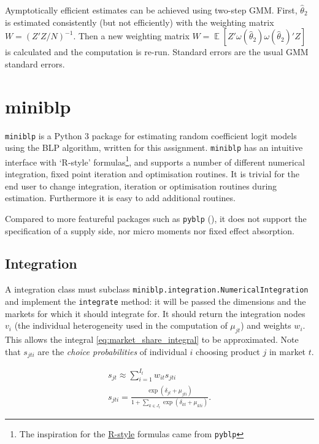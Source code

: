 \documentclass[parskip=half]{scrartcl}
\DeclareMathOperator{\E}{\mathbb{E}}
\newcommand{\code}[1]{\texttt{#1}}
\begin{document}
Aymptotically efficient estimates can be achieved using two-step GMM. First, \(\hat{\theta}_2\) is estimated consistently (but not efficiently) with the weighting matrix \(W = (Z'Z/N)^{-1}\). Then a new weighting matrix \(W = \E[Z'\omega(\hat{\theta}_2)\omega(\hat{\theta}_2)'Z]\) is calculated and the computation is re-run. Standard errors are the usual GMM standard errors.

\section{miniblp}

\code{miniblp} is a Python 3 package for estimating random coefficient logit models using the BLP algorithm, written for this assignment. \code{miniblp} has an intuitive interface with `R-style' formulas\footnote{The inspiration for the \href{https://patsy.readthedocs.io/en/latest/}{R-style} formulas came from \code{pyblp}}, and supports a number of different numerical integration, fixed point iteration and optimisation routines. It is trivial for the end user to change integration, iteration or optimisation routines during estimation. Furthermore it is easy to add additional routines.

Compared to more featureful packages such as \code{pyblp} (\cite{conlon2019best}), it does not support the specification of a supply side, nor micro moments nor fixed effect absorption.

\subsection{Integration}

A integration class must subclass \code{miniblp.integration.NumericalIntegration} and implement the \code{integrate} method: it will be passed the dimensions and the markets for which it should integrate for. It should return the integration nodes \(v_i\) (the individual heterogeneity used in the computation of \(\mu_{jt}\)) and weights \(w_i\). This allows the integral \eqref{eq:market_share_integral} to be approximated. Note that \(s_{jti}\) are the \emph{choice probabilities} of individual \(i\) choosing product \(j\) in market \(t\).

\begin{gather}
s_{jt} \approx \sum_{i=1}^{I_t} w_{it} s_{jti} \\
\label{eq:choice_probabilities}
s_{jti} = \frac{\exp(\delta_{jt} + \mu_{jti})}{1 + \sum_{k \in J_t} \exp(\delta_{kt} + \mu_{kti})}.
\end{gather}
\end{document}
